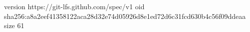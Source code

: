 version https://git-lfs.github.com/spec/v1
oid sha256:a8a2eef41358122aca28d32e74d05926d8e1ed72d6c31fcd630b4c56f09ddeaa
size 61
